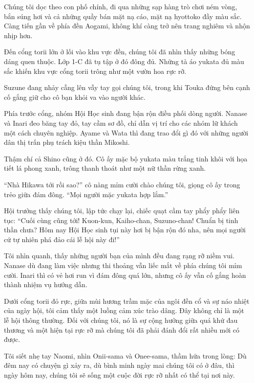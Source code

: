 \documentclass[../main.tex]{subfiles}
\begin{document}
Chúng tôi dọc theo con phố chính, đi qua những sạp hàng trò chơi ném vòng, bắn súng hơi và cả những quầy bán mặt nạ cáo, mặt nạ hyottoko đầy màu sắc. Càng tiến gần về phía đền Aogami, không khí càng trở nên trang nghiêm và nhộn nhịp hơn.

Đến cổng torii lớn ở lối vào khu vực đền, chúng tôi đã nhìn thấy những bóng dáng quen thuộc. Lớp 1-C đã tụ tập ở đó đông đủ. Những tà áo yukata đủ màu sắc khiến khu vực cổng torii trông như một vườn hoa rực rỡ.

Suzune đang nhảy cẫng lên vẫy tay gọi chúng tôi, trong khi Touka đứng bên cạnh cố gắng giữ cho cô bạn khỏi va vào người khác.

Phía trước cổng, nhóm Hội Học sinh đang bận rộn điều phối dòng người. Nanase và Inari đeo băng tay đỏ, tay cầm sơ đồ, chỉ dẫn vị trí cho các nhóm lữ khách một cách chuyên nghiệp. Ayame và Wata thì đang trao đổi gì đó với những người dân thị trấn phụ trách kiệu thần Mikoshi.

Thậm chí cả Shino cũng ở đó. Cô ấy mặc bộ yukata màu trắng tinh khôi với họa tiết lá phong xanh, trông thanh thoát như một nữ thần rừng xanh.

``Nhà Hikawa tới rồi sao?'' cô nàng mỉm cười chào chúng tôi, giọng cô ấy trong trẻo giữa đám đông. ``Mọi người mặc yukata hợp lắm.''

Hội trưởng thấy chúng tôi, lập tức chạy lại, chiếc quạt cầm tay phẩy phẩy liên tục: ``Cuối cùng cũng tới! Kuon-kun, Kaiho-chan, Suzuno-chan! Chuẩn bị tinh thần chưa? Hôm nay Hội Học sinh tụi này hơi bị bận rộn đó nha, nên mọi người cứ tự nhiên phá đảo cái lễ hội này đi!''

Tôi nhìn quanh, thấy những người bạn của mình đều đang rạng rỡ niềm vui. Nanase dù đang làm việc nhưng thi thoảng vẫn liếc mắt về phía chúng tôi mỉm cười. Inari thì có vẻ hơi run vì đám đông quá lớn, nhưng cô ấy vẫn cố gắng hoàn thành nhiệm vụ hướng dẫn.

Dưới cổng torii đỏ rực, giữa mùi hương trầm mặc của ngôi đền cổ và sự náo nhiệt của ngày hội, tôi cảm thấy một luồng cảm xúc trào dâng. Đây không chỉ là một lễ hội thông thường. Đối với chúng tôi, nó là sự cộng hưởng giữa quá khứ đau thương và một hiện tại rực rỡ mà chúng tôi đã phải đánh đổi rất nhiều mới có được.

Tôi siết nhẹ tay Naomi, nhìn Onii-sama và Onee-sama, thầm hứa trong lòng: Dù đêm nay có chuyện gì xảy ra, dù bình minh ngày mai chúng tôi có ở đâu, thì ngày hôm nay, chúng tôi sẽ sống một cuộc đời rực rỡ nhất có thể tại nơi này.
\end{document}
